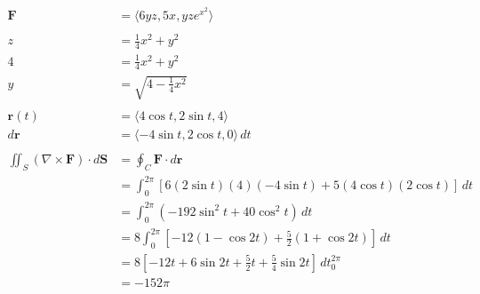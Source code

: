 \documentclass{article}
\begin{document}
\begin{align*}
  \mathbf{F}                                            & = \langle 6 y z, 5 x, y z e^{x^2} \rangle                                                   \\ \\
  z                                                     & = \frac{1}{4} x^2 + y^2                                                                     \\
  4                                                     & = \frac{1}{4} x^2 + y^2                                                                     \\
  y                                                     & = \sqrt{4 - \frac{1}{4} x^2}                                                                \\ \\
  \mathbf{r}(t)                                         & = \langle 4 \cos t, 2 \sin t, 4 \rangle                                                     \\
  d \mathbf{r}                                          & = \langle -4 \sin t, 2 \cos t, 0 \rangle \,dt                                               \\ \\
  \iint_S (\nabla \times \mathbf{F}) \cdot d \mathbf{S} & = \oint_C \mathbf{F} \cdot d \mathbf{r}                                                     \\
                                                        & = \int_0^{2 \pi} [6 (2 \sin t) (4) (-4 \sin t) + 5 (4 \cos t) (2 \cos t)] \,dt              \\
                                                        & = \int_0^{2 \pi} (-192 \sin^2 t + 40 \cos^2 t) \,dt                                         \\
                                                        & = 8 \int_0^{2 \pi} \left[ -12 (1 - \cos 2 t) + \frac{5}{2} (1 + \cos 2 t) \right] \,dt      \\
                                                        & = 8 \left[ -12 t + 6 \sin 2 t + \frac{5}{2} t + \frac{5}{4} \sin 2 t \right] \,dt_0^{2 \pi} \\
                                                        & = -152 \pi
\end{align*}

\setcounter{subsubsection}{16}
\subsubsection{}
\end{document}
